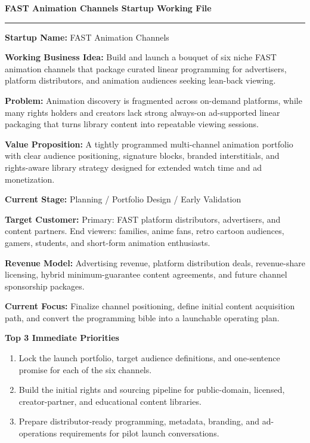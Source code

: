 \documentclass[10pt]{article}
\newcommand{\entry}[2]{\textbf{#1} #2\par}
\newcommand{\stagebox}[1]{\fcolorbox{black}{gray!8}{\strut\hspace{0.4em}#1\hspace{0.4em}}}
\begin{document}
\small

{\LARGE\bfseries FAST Animation Channels Startup Working File} \hfill \stagebox{Living Document - One Page}

\vspace{4pt}
\hrule
\vspace{6pt}

\entry{Startup Name:}{FAST Animation Channels}
\entry{Working Business Idea:}{Build and launch a bouquet of six niche FAST animation channels that package curated linear programming for advertisers, platform distributors, and animation audiences seeking lean-back viewing.}

\begin{minipage}[t]{0.49\textwidth}
\entry{Problem:}{Animation discovery is fragmented across on-demand platforms, while many rights holders and creators lack strong always-on ad-supported linear packaging that turns library content into repeatable viewing sessions.}
\entry{Value Proposition:}{A tightly programmed multi-channel animation portfolio with clear audience positioning, signature blocks, branded interstitials, and rights-aware library strategy designed for extended watch time and ad monetization.}
\entry{Current Stage:}{Planning / Portfolio Design / Early Validation}
\end{minipage}\hfill
\begin{minipage}[t]{0.49\textwidth}
\entry{Target Customer:}{Primary: FAST platform distributors, advertisers, and content partners. End viewers: families, anime fans, retro cartoon audiences, gamers, students, and short-form animation enthusiasts.}
\entry{Revenue Model:}{Advertising revenue, platform distribution deals, revenue-share licensing, hybrid minimum-guarantee content agreements, and future channel sponsorship packages.}
\entry{Current Focus:}{Finalize channel positioning, define initial content acquisition path, and convert the programming bible into a launchable operating plan.}
\end{minipage}

\textbf{Top 3 Immediate Priorities}
\begin{enumerate}
    \item [Priority 1.] Lock the launch portfolio, target audience definitions, and one-sentence promise for each of the six channels.
    \item [Priority 2.] Build the initial rights and sourcing pipeline for public-domain, licensed, creator-partner, and educational content libraries.
    \item [Priority 3.] Prepare distributor-ready programming, metadata, branding, and ad-operations requirements for pilot launch conversations.
\end{enumerate}
\end{document}
